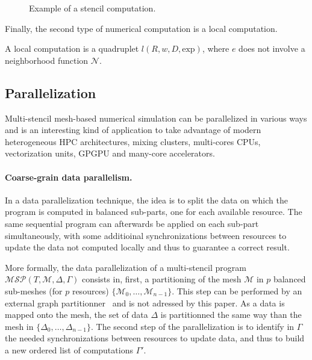 \begin{figure}[!h]\begin{center}
  \caption{Example of a stencil computation.}
  \label{fig:ex}
\end{center}\end{figure}

Finally, the second type of numerical computation is a local computation.
\begin{mydef}
A local computation is a quadruplet $l(R,w,D,\text{exp})$, where $e$ does not involve a neighborhood function $\mathcal{N}$.
\end{mydef}

\subsection{Parallelization}
\label{sect:parall}
Multi-stencil mesh-based numerical simulation can be parallelized in various ways and is an interesting kind of application to take advantage of modern heterogeneous HPC architectures, mixing clusters, multi-cores CPUs, vectorization units, GPGPU and many-core accelerators.

\paragraph{Coarse-grain data parallelism.} In a data parallelization technique, the idea is to split the data on which the program is computed in balanced sub-parts, one for each available resource. The same sequential program can afterwards be applied on each sub-part simultaneously, with some additioinal synchronizations between resources to update the data not computed locally and thus to guarantee a correct result.

More formally, the data parallelization of a multi-stencil program $\mathcal{MSP}(T,\mathcal{M},\Delta,\Gamma)$ consists in, first, a partitioning of the mesh $\mathcal{M}$ in $p$ balanced sub-meshes (for $p$ resources) $\{\mathcal{M}_0,\dots,\mathcal{M}_{n-1}\}$. This step can be performed by an external graph partitionner~\cite{} and is not adressed by this paper. As a data is mapped onto the mesh, the set of data $\Delta$ is partitionned the same way than the mesh in $\{\Delta_0,\dots,\Delta_{n-1}\}$. The second step of the parallelization is to identify in $\Gamma$ the needed synchronizations between resources to update data, and thus to build a new ordered list of computations $\Gamma'$.

